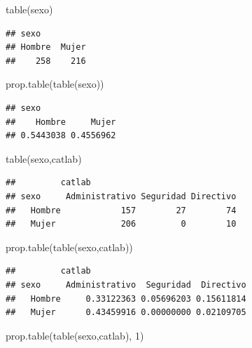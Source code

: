 \documentclass[
]{book}
\newenvironment{Shaded}{\begin{snugshade}}{\end{snugshade}}
\newcommand{\DecValTok}[1]{\textcolor[rgb]{0.00,0.00,0.81}{#1}}
\newcommand{\FunctionTok}[1]{\textcolor[rgb]{0.00,0.00,0.00}{#1}}
\newcommand{\NormalTok}[1]{#1}
\theoremstyle{break}
\theoremstyle{nonumberplain}
\begin{document}
\begin{Shaded}
\begin{Highlighting}[]
\FunctionTok{table}\NormalTok{(sexo)}
\end{Highlighting}
\end{Shaded}

\begin{verbatim}
## sexo
## Hombre  Mujer 
##    258    216
\end{verbatim}

\begin{Shaded}
\begin{Highlighting}[]
\FunctionTok{prop.table}\NormalTok{(}\FunctionTok{table}\NormalTok{(sexo))}
\end{Highlighting}
\end{Shaded}

\begin{verbatim}
## sexo
##    Hombre     Mujer 
## 0.5443038 0.4556962
\end{verbatim}

\begin{Shaded}
\begin{Highlighting}[]
\FunctionTok{table}\NormalTok{(sexo,catlab)}
\end{Highlighting}
\end{Shaded}

\begin{verbatim}
##         catlab
## sexo     Administrativo Seguridad Directivo
##   Hombre            157        27        74
##   Mujer             206         0        10
\end{verbatim}

\begin{Shaded}
\begin{Highlighting}[]
\FunctionTok{prop.table}\NormalTok{(}\FunctionTok{table}\NormalTok{(sexo,catlab))}
\end{Highlighting}
\end{Shaded}

\begin{verbatim}
##         catlab
## sexo     Administrativo  Seguridad  Directivo
##   Hombre     0.33122363 0.05696203 0.15611814
##   Mujer      0.43459916 0.00000000 0.02109705
\end{verbatim}

\begin{Shaded}
\begin{Highlighting}[]
\FunctionTok{prop.table}\NormalTok{(}\FunctionTok{table}\NormalTok{(sexo,catlab), }\DecValTok{1}\NormalTok{)}
\end{Highlighting}
\end{Shaded}
\end{document}
